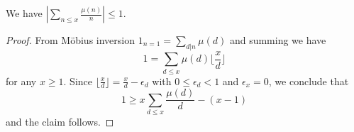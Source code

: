 \begin{proposition}
\label{mun}
\leanok
We have $|\sum_{n \leq x} \frac{\mu(n)}{n}| \leq 1$.
\end{proposition}
\begin{proof}
\leanok
From M\"obius inversion $1_{n=1} = \sum_{d|n} \mu(d)$ and summing we have
    $$ 1 = \sum_{d \leq x} \mu(d) \lfloor \frac{x}{d} \rfloor$$
    for any $x \geq 1$. Since $\lfloor \frac{x}{d} \rfloor = \frac{x}{d} - \epsilon_d$ with
    $0 \leq \epsilon_d < 1$ and $\epsilon_x = 0$, we conclude that
    $$ 1 ≥ x \sum_{d \leq x} \frac{\mu(d)}{d} - (x - 1)$$
    and the claim follows.
\end{proof}
